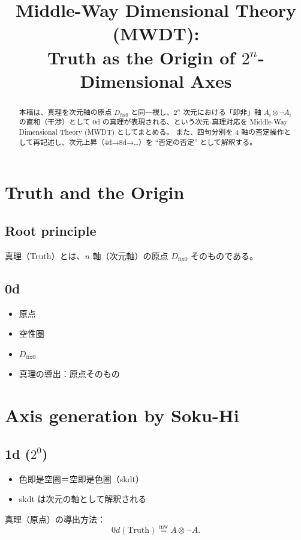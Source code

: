 \documentclass[uplatex,dvipdfmx,12pt,a4paper]{jsarticle}
\title{Middle-Way Dimensional Theory (MWDT):\\
Truth as the Origin of $2^n$-Dimensional Axes}
\author{}
\date{}
\newcommand{\dfix}{D_{\text{fix0}}}
\newcommand{\mweq}{\mathrel{\overset{\mathrm{mw}}{=}}}
\begin{document}
\maketitle

\begin{abstract}
本稿は、真理を次元軸の原点 $\dfix$ と同一視し、$2^n$ 次元における「即非」軸 $A_i\otimes\neg A_i$ の直和（干渉）として $0$d の真理が表現される、という次元‐真理対応を Middle-Way Dimensional Theory (MWDT) としてまとめる。
また、四句分別を $4$ 軸の否定操作として再記述し、次元上昇（4d→8d→…）を ``否定の否定'' として解釈する。
\end{abstract}

\section{Truth and the Origin}
\subsection{Root principle}
真理（Truth）とは、$n$ 軸（次元軸）の原点 $\dfix$ そのものである。

\subsection{0d}
\begin{itemize}
  \item 原点
  \item 空性圏
  \item $\dfix$
  \item 真理の導出：原点そのもの
\end{itemize}

\section{Axis generation by Soku-Hi}
\subsection{1d ($2^0$)}
\begin{itemize}
  \item 色即是空圏＝空即是色圏（skdt）
  \item skdt は次元の軸として解釈される
\end{itemize}

真理（原点）の導出方法：
\begin{equation}
  0d(\text{Truth}) \mweq A\otimes \neg A.
\end{equation}
\end{document}
